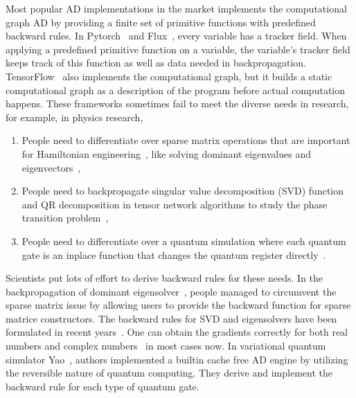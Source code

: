 \documentclass{article}
\newcommand{\<}{\langle}
\renewcommand{\>}{\rangle}
\theoremstyle{definition}\newtheorem{definition}{\textit{Definition}}
\begin{document}
    Most popular AD implementations in the market implements the computational graph AD by providing a finite set of primitive functions with predefined backward rules.
    In Pytorch~\cite{Paszke2017} and Flux~\cite{Innes2018a}, every variable has a tracker field. When applying a predefined primitive function on a variable, the variable's tracker field keeps track of this function as well as data needed in backpropagation. TensorFlow~\cite{Tensorflow2015} also implements the computational graph, but it builds a static computational graph as a description of the program before actual computation happens.
    These frameworks sometimes fail to meet the diverse needs in research, for example, in physics research,
    \begin{enumerate}
        \item People need to differentiate over sparse matrix operations that are important for Hamiltonian engineering~\cite{Xie2020}, like solving dominant eigenvalues and eigenvectors~\cite{Golub2012},
        \item People need to backpropagate singular value decomposition (SVD) function and QR decomposition in tensor network algorithms to study the phase transition problem~\cite{Golub2012, Liao2019},
        \item People need to differentiate over a quantum simulation where each quantum gate is an inplace function that changes the quantum register directly~\cite{Luo2019}.
    \end{enumerate}
    Scientists put lots of effort to derive backward rules for these needs. In the backpropagation of dominant eigensolver~\cite{Xie2020}, people managed to circumvent the sparse matrix issue by allowing users to provide the backward function for sparse matrice constructors.
    The backward rules for SVD and eigensolvers have been formulated in recent years~\cite{Seeger2017,Wan2019,Hubig2019}. One can obtain the gradients correctly for both real numbers and complex numbers~\cite{Wan2019} in most cases now.
    In variational quantum simulator Yao~\cite{Luo2019}, authors implemented a builtin cache free AD engine by utilizing the reversible nature of quantum computing. They derive and implement the backward rule for each type of quantum gate.
\end{document}
